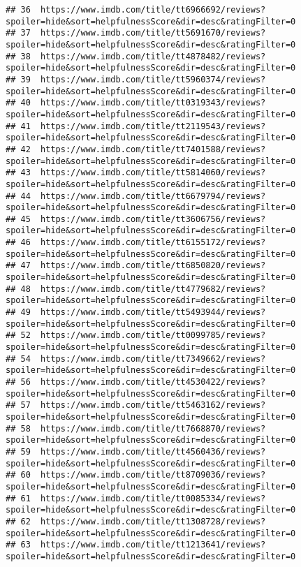\documentclass[]{article}
\begin{document}
\begin{verbatim}
## 36  https://www.imdb.com/title/tt6966692/reviews?spoiler=hide&sort=helpfulnessScore&dir=desc&ratingFilter=0
## 37  https://www.imdb.com/title/tt5691670/reviews?spoiler=hide&sort=helpfulnessScore&dir=desc&ratingFilter=0
## 38  https://www.imdb.com/title/tt4878482/reviews?spoiler=hide&sort=helpfulnessScore&dir=desc&ratingFilter=0
## 39  https://www.imdb.com/title/tt5960374/reviews?spoiler=hide&sort=helpfulnessScore&dir=desc&ratingFilter=0
## 40  https://www.imdb.com/title/tt0319343/reviews?spoiler=hide&sort=helpfulnessScore&dir=desc&ratingFilter=0
## 41  https://www.imdb.com/title/tt2119543/reviews?spoiler=hide&sort=helpfulnessScore&dir=desc&ratingFilter=0
## 42  https://www.imdb.com/title/tt7401588/reviews?spoiler=hide&sort=helpfulnessScore&dir=desc&ratingFilter=0
## 43  https://www.imdb.com/title/tt5814060/reviews?spoiler=hide&sort=helpfulnessScore&dir=desc&ratingFilter=0
## 44  https://www.imdb.com/title/tt6679794/reviews?spoiler=hide&sort=helpfulnessScore&dir=desc&ratingFilter=0
## 45  https://www.imdb.com/title/tt3606756/reviews?spoiler=hide&sort=helpfulnessScore&dir=desc&ratingFilter=0
## 46  https://www.imdb.com/title/tt6155172/reviews?spoiler=hide&sort=helpfulnessScore&dir=desc&ratingFilter=0
## 47  https://www.imdb.com/title/tt6850820/reviews?spoiler=hide&sort=helpfulnessScore&dir=desc&ratingFilter=0
## 48  https://www.imdb.com/title/tt4779682/reviews?spoiler=hide&sort=helpfulnessScore&dir=desc&ratingFilter=0
## 49  https://www.imdb.com/title/tt5493944/reviews?spoiler=hide&sort=helpfulnessScore&dir=desc&ratingFilter=0
## 52  https://www.imdb.com/title/tt0099785/reviews?spoiler=hide&sort=helpfulnessScore&dir=desc&ratingFilter=0
## 54  https://www.imdb.com/title/tt7349662/reviews?spoiler=hide&sort=helpfulnessScore&dir=desc&ratingFilter=0
## 56  https://www.imdb.com/title/tt4530422/reviews?spoiler=hide&sort=helpfulnessScore&dir=desc&ratingFilter=0
## 57  https://www.imdb.com/title/tt5463162/reviews?spoiler=hide&sort=helpfulnessScore&dir=desc&ratingFilter=0
## 58  https://www.imdb.com/title/tt7668870/reviews?spoiler=hide&sort=helpfulnessScore&dir=desc&ratingFilter=0
## 59  https://www.imdb.com/title/tt4560436/reviews?spoiler=hide&sort=helpfulnessScore&dir=desc&ratingFilter=0
## 60  https://www.imdb.com/title/tt8709036/reviews?spoiler=hide&sort=helpfulnessScore&dir=desc&ratingFilter=0
## 61  https://www.imdb.com/title/tt0085334/reviews?spoiler=hide&sort=helpfulnessScore&dir=desc&ratingFilter=0
## 62  https://www.imdb.com/title/tt1308728/reviews?spoiler=hide&sort=helpfulnessScore&dir=desc&ratingFilter=0
## 63  https://www.imdb.com/title/tt1213641/reviews?spoiler=hide&sort=helpfulnessScore&dir=desc&ratingFilter=0

\end{verbatim}
\end{document}
